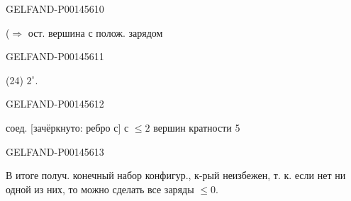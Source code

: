 \begin{GelfandAdjacentEvidence}{GELFAND-P001456}{10}


(\(\Rightarrow\) ост. вершина с полож. зарядом

\end{GelfandAdjacentEvidence}
\begin{GelfandAdjacentEvidence}{GELFAND-P001456}{11}


(24) \(2^\circ\).
\end{GelfandAdjacentEvidence}
\begin{GelfandAdjacentEvidence}{GELFAND-P001456}{12}

соед. [зачёркнуто: ребро с] с \(\leqslant2\) вершин кратности 5
\end{GelfandAdjacentEvidence}
\begin{GelfandAdjacentEvidence}{GELFAND-P001456}{13}

\end{GelfandAdjacentEvidence}


В итоге получ. конечный набор конфигур., к-рый неизбежен, т. к. если нет ни одной из них, то можно сделать все заряды \(\leq0\).


